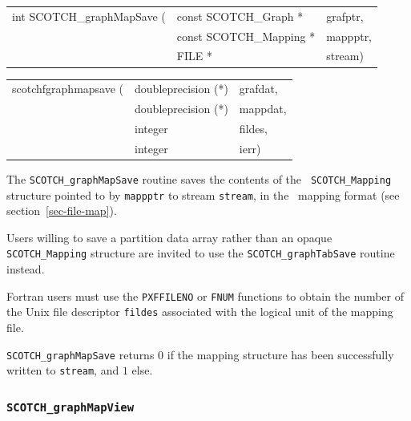 \begin{itemize}
\progsyn

{\tt\begin{tabular}{l@{}ll}
int SCOTCH\_graphMapSave ( & const SCOTCH\_Graph *   & grafptr, \\
                           & const SCOTCH\_Mapping * & mappptr, \\
                           & FILE *                  & stream)
\end{tabular}}

{\tt\begin{tabular}{l@{}ll}
scotchfgraphmapsave ( & doubleprecision (*) & grafdat, \\
                      & doubleprecision (*) & mappdat, \\
                      & integer             & fildes,  \\
                      & integer             & ierr)
\end{tabular}}

\progdes

The {\tt SCOTCH\_graphMapSave} routine saves the contents of the {\tt
SCOTCH\_\lbt Mapping} structure pointed to by {\tt mappptr} to stream
{\tt stream}, in the \scotch\ mapping format (see
section~\ref{sec-file-map}).

Users willing to save a partition data array rather than an opaque
{\tt SCOTCH\_\lbt Mapping} structure are invited to use the
{\tt SCOTCH\_\lbt graph\lbt Tab\lbt Save} routine instead.

Fortran users must use the {\tt PXFFILENO} or {\tt FNUM} functions to
obtain the number of the Unix file descriptor {\tt fildes} associated
with the logical unit of the mapping file.

\progret

{\tt SCOTCH\_graphMapSave} returns $0$ if the mapping structure
has been successfully written to {\tt stream}, and $1$ else.
\end{itemize}

\subsubsection{{\tt SCOTCH\_graphMapView}}

